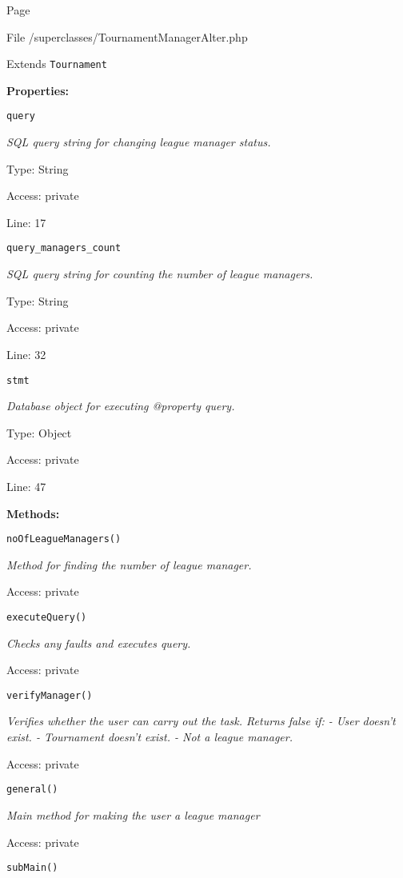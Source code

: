 Page \pageref{TournamentManagerAlter.php}

File /superclasses/TournamentManagerAlter.php

Extends \texttt{Tournament}

\textbf{Properties:}

\texttt{query}

{\scriptsize
\textit{SQL query string for changing league manager status.}

Type: String

Access: private

Line: 17

}
\texttt{query\_managers\_count}

{\scriptsize
\textit{SQL query string for counting the number of league managers.}

Type: String

Access: private

Line: 32

}
\texttt{stmt}

{\scriptsize
\textit{Database object for executing @property query.}

Type: Object

Access: private

Line: 47

}
\textbf{Methods:}

\texttt{noOfLeagueManagers()}

{\scriptsize
\textit{Method for finding the number of league manager.}

Access: private

}

\texttt{executeQuery()}

{\scriptsize
\textit{Checks any faults and executes query.}

Access: private

}

\texttt{verifyManager()}

{\scriptsize
\textit{Verifies whether the user can carry out the task.
Returns false if:
- User doesn't exist.
- Tournament doesn't exist.
- Not a league manager.}

Access: private

}

\texttt{general()}

{\scriptsize
\textit{Main method for making the user a league manager}

Access: private

}

\texttt{subMain()}

